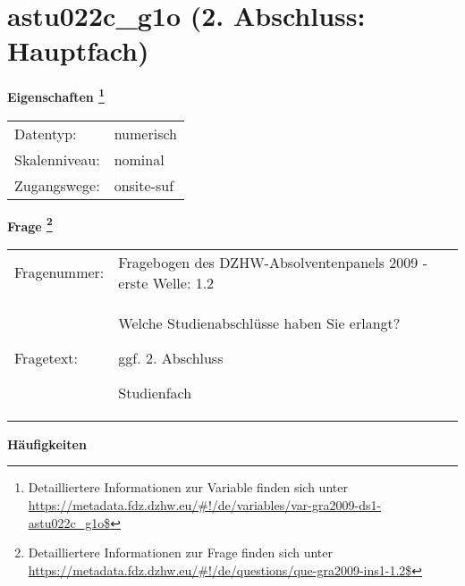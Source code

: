 
    \setcounter{footnote}{0}

    \vspace*{-1.8cm}
	\section{astu022c\_g1o (2. Abschluss: Hauptfach)}
	\label{section:astu022c_g1o}



    \vspace*{0.5cm}
    \noindent\textbf{Eigenschaften
	\footnote{Detailliertere Informationen zur Variable finden sich unter
		\url{https://metadata.fdz.dzhw.eu/\#!/de/variables/var-gra2009-ds1-astu022c_g1o$}}}\\
	\begin{tabularx}{\hsize}{@{}lX}
	Datentyp: & numerisch \\
	Skalenniveau: & nominal \\
	Zugangswege: &
	  onsite-suf
 \\
    \end{tabularx}



				\vspace*{0.5cm}
                \noindent\textbf{Frage
	                \footnote{Detailliertere Informationen zur Frage finden sich unter
		              \url{https://metadata.fdz.dzhw.eu/\#!/de/questions/que-gra2009-ins1-1.2$}}}\\
				\begin{tabularx}{\hsize}{@{}lX}
					Fragenummer: &
					  Fragebogen des DZHW-Absolventenpanels 2009 - erste Welle:
					  1.2
 \\
					Fragetext: & Welche Studienabschlüsse haben Sie erlangt?\par  ggf. 2. Abschluss\par  Studienfach \\
				\end{tabularx}





        		\vspace*{0.5cm}
                \noindent\textbf{Häufigkeiten}

